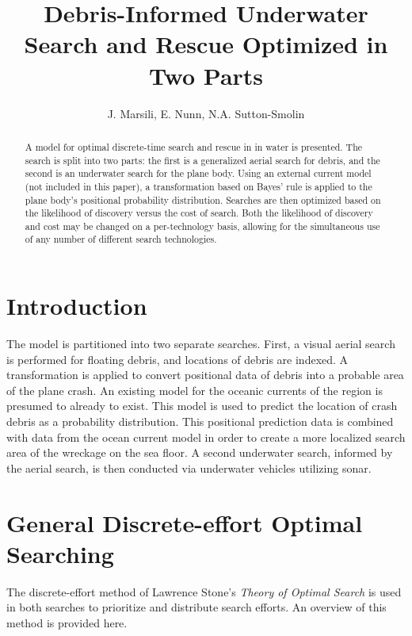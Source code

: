 \documentclass[a4paper]{article}
\title{Debris-Informed Underwater Search and Rescue Optimized in Two Parts}
\author{J. Marsili, E. Nunn, N.A. Sutton-Smolin}
\date{}
\begin{document}
\maketitle

\begin{abstract}
A model for optimal discrete-time search and rescue in in water is presented. The search is split into two parts: the first is a generalized aerial search for debris, and the second is an underwater search for the plane body.  Using an external current model (not included in this paper), a transformation based on Bayes' rule is applied to the plane body's positional probability distribution. Searches are then optimized based on the likelihood of discovery versus the cost of search. Both the likelihood of discovery and cost may be changed on a per-technology basis, allowing for the simultaneous use of any number of different search technologies. 
\end{abstract}

\pagebreak 

\section{Introduction}

The model is partitioned into two separate searches. First, a visual aerial search is performed for floating debris, and locations of debris are indexed. A transformation is applied to convert positional data of debris into a probable area of the plane crash. An existing model for the oceanic currents of the region is presumed to already to exist. This model is used to predict the location of crash debris as a probability distribution. This positional prediction data is combined with data from the ocean current model in order to create a more localized search area of the wreckage on the sea floor. A second underwater search, informed by the aerial search, is then conducted via underwater vehicles utilizing sonar.



\section{General Discrete-effort Optimal Searching}

The discrete-effort method of Lawrence Stone's \textit{Theory of Optimal Search} is used in both searches to prioritize and distribute search efforts. An overview of this method is provided here. 
\end{document}
